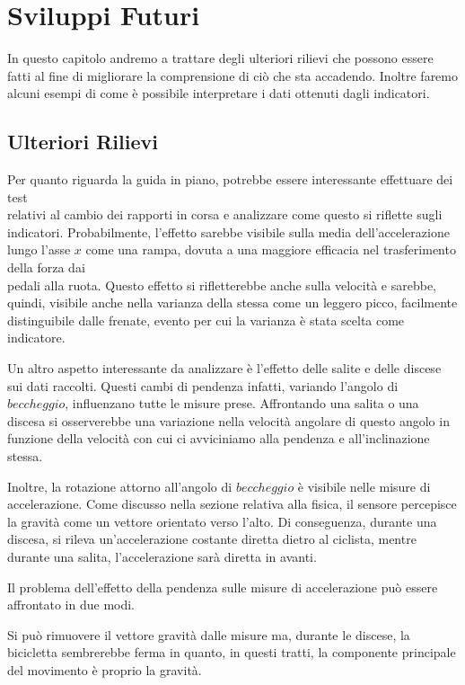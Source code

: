\documentclass[class=article]{standalone}
\begin{document}
	\section{Sviluppi Futuri}
	In questo capitolo andremo a trattare degli ulteriori rilievi che possono essere fatti al fine di migliorare la comprensione di ciò che sta accadendo. Inoltre faremo alcuni esempi di come è possibile interpretare i dati ottenuti dagli indicatori.
	
	\subsection{Ulteriori Rilievi}
	Per quanto riguarda la guida in piano, potrebbe essere interessante effettuare dei test \\relativi al cambio dei rapporti in corsa e analizzare come questo si riflette sugli indicatori. Probabilmente, l'effetto sarebbe visibile sulla media dell'accelerazione lungo l'asse \(x\) come una rampa, dovuta a una maggiore efficacia nel trasferimento della forza dai \\pedali alla ruota. Questo effetto si rifletterebbe anche sulla velocità e sarebbe, quindi, visibile anche nella varianza della stessa come un leggero picco, facilmente distinguibile dalle frenate, evento per cui la varianza è stata scelta come indicatore.\hfill\break
	
	Un altro aspetto interessante da analizzare è l'effetto delle salite e delle discese sui dati raccolti. Questi cambi di pendenza infatti, variando l'angolo di \(beccheggio\), influenzano tutte le misure prese. Affrontando una salita o una discesa si osserverebbe una variazione nella velocità angolare di questo angolo in funzione della velocità con cui ci avviciniamo alla pendenza e all'inclinazione stessa.
	
	Inoltre, la rotazione attorno all'angolo di \(beccheggio\) è visibile nelle misure di accelerazione. Come discusso nella sezione relativa alla fisica, il sensore percepisce la gravità come un vettore orientato verso l'alto. Di conseguenza, durante una discesa, si rileva un'accelerazione costante diretta dietro al ciclista, mentre durante una salita, l'accelerazione sarà diretta in avanti.\hfill\break
	
	Il problema dell'effetto della pendenza sulle misure di accelerazione può essere affrontato in due modi.
	
	Si può rimuovere il vettore gravità dalle misure ma, durante le discese, la bicicletta sembrerebbe ferma in quanto, in questi tratti, la componente principale del movimento è proprio la gravità.
	
\end{document}
